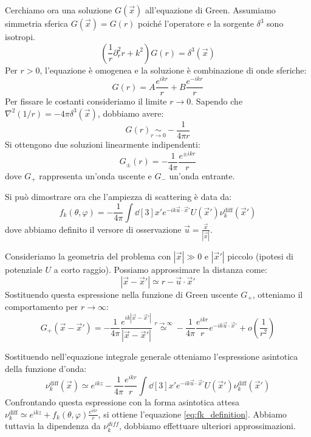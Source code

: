 Cerchiamo ora una soluzione \( G(\vec{x}) \) all'equazione di Green.
Assumiamo simmetria sferica \( G(\vec{x})=G(r) \) poiché l'operatore e la sorgente \( \delta^3 \) sono isotropi.
\begin{equation}
    \left( \frac{1}{r} \partial_r^2 r + k^2 \right) G(r) = \delta^3(\vec{x})
\end{equation}
Per \( r > 0 \), l'equazione è omogenea e la soluzione è combinazione di onde sferiche:
\[
    G(r) = A \frac{e^{ikr}}{r} + B \frac{e^{-ikr}}{r}
\]
Per fissare le costanti consideriamo il limite \( r \to 0 \). Sapendo che \( \nabla^2(1/r) = -4\pi \delta^3(\vec{x}) \), dobbiamo avere:
\[
    G(r) \underset{r \to 0}{\sim} -\frac{1}{4\pi r}
\]
Si ottengono due soluzioni linearmente indipendenti:
\begin{equation}
    G_{\pm}(r) = -\frac{1}{4\pi} \frac{e^{\pm ikr}}{r}
\end{equation}
dove \( G_+ \) rappresenta un'onda uscente e \( G_- \) un'onda entrante.

Si può dimostrare ora che l'ampiezza di scattering è data da:
\begin{equation} \label{eq:fk_definition}
    f_k(\theta, \varphi) = -\frac{1}{4\pi} \int \dd[3]{x'} e^{-i k \vec{u} \cdot \vec{x}'} U(\vec{x}') \nu_k^{\text{diff}}(\vec{x}')
\end{equation}
dove abbiamo definito il versore di osservazione $\vec{u} = \frac{\vec{x}}{|\vec{x}|}$.


Consideriamo la geometria del problema con $|\vec{x}| \gg 0$ e $|\vec{x}'|$ piccolo (ipotesi di potenziale $U$ a corto raggio).
Possiamo approssimare la distanza come:
\[
    |\vec{x} - \vec{x}'| \simeq r - \vec{u} \cdot \vec{x}'
\]
Sostituendo questa espressione nella funzione di Green uscente $G_+$, otteniamo il comportamento per $r \to \infty$:
\[
    G_+(\vec{x}-\vec{x}') = -\frac{1}{4\pi} \frac{e^{ik|\vec{x}-\vec{x}'|}}{|\vec{x}-\vec{x}'|} 
    \overset{r \to \infty}{\simeq} 
    -\frac{1}{4\pi} \frac{e^{ikr}}{r} e^{-ik \vec{u} \cdot \vec{x}'} + o\left(\frac{1}{r^2}\right)
\]

Sostituendo nell'equazione integrale generale otteniamo l'espressione asintotica della funzione d'onda:
\[
    \nu_k^{\text{diff}}(\vec{x}) \simeq e^{ikz} - \frac{1}{4\pi} \frac{e^{ikr}}{r} \int \dd[3]{x'} e^{-ik \vec{u} \cdot \vec{x}'} U(\vec{x}') \nu_k^{\text{diff}}(\vec{x}')
\]
Confrontando questa espressione con la forma asintotica attesa $\nu_k^{\text{diff}} \simeq e^{ikz} + f_k(\theta, \varphi)\frac{e^{ikr}}{r}$, si ottiene l'equazione \eqref{eq:fk_definition}. 
Abbiamo tuttavia la dipendenza da \(\nu^{diff}_k\), dobbiamo effettuare ulteriori approssimazioni.


